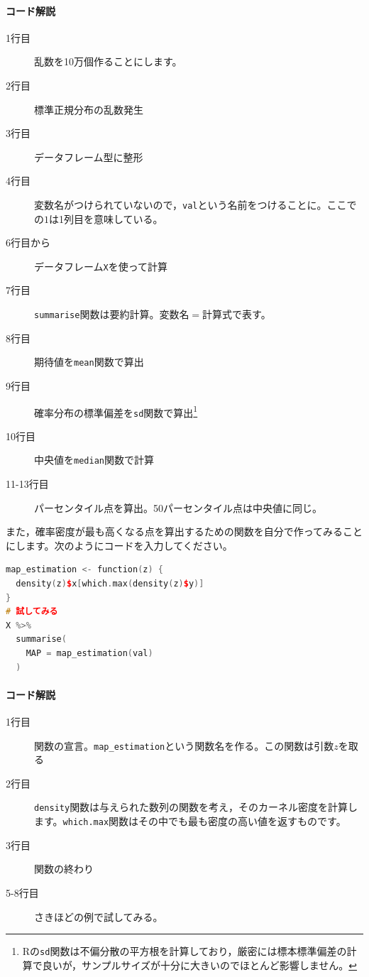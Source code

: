\documentclass{ltjsbook}
\begin{document}
\paragraph{コード解説}
\begin{description}
	\item[1行目] 乱数を10万個作ることにします。
	\item[2行目] 標準正規分布の乱数発生
	\item[3行目] データフレーム型に整形
	\item[4行目] 変数名がつけられていないので，\texttt{val}という名前をつけることに。ここでの$1$は1列目を意味している。
	\item[6行目から] データフレーム\texttt{X}を使って計算
	\item[7行目] \texttt{summarise}関数は要約計算。変数名$=$計算式で表す。
	\item[8行目] 期待値を\texttt{mean}関数で算出
	\item[9行目] 確率分布の標準偏差を\texttt{sd}関数で算出\footnote{Rの\texttt{sd}関数は不偏分散の平方根を計算しており，厳密には標本標準偏差の計算で良いが，サンプルサイズが十分に大きいのでほとんど影響しません。}
	\item[10行目] 中央値を\texttt{median}関数で計算
	\item[11-13行目] パーセンタイル点を算出。50パーセンタイル点は中央値に同じ。
\end{description}

また，確率密度が最も高くなる点を算出するための関数を自分で作ってみることにします。次のようにコードを入力してください。
\begin{lstlisting}[language=c++,label={code:17_07},caption={確率分布の要約}]
map_estimation <- function(z) {
  density(z)$x[which.max(density(z)$y)]
}
# 試してみる
X %>%
  summarise(
    MAP = map_estimation(val)
  )

\end{lstlisting}
\paragraph{コード解説}
\begin{description}
	\item[1行目] 関数の宣言。\verb|map_estimation|という関数名を作る。この関数は引数$z$を取る
	\item[2行目] \texttt{density}関数は与えられた数列の関数を考え，そのカーネル密度を計算します。\texttt{which.max}関数はその中でも最も密度の高い値を返すものです。
	\item[3行目] 関数の終わり
	\item[5-8行目] さきほどの例で試してみる。
\end{description}
\end{document}
